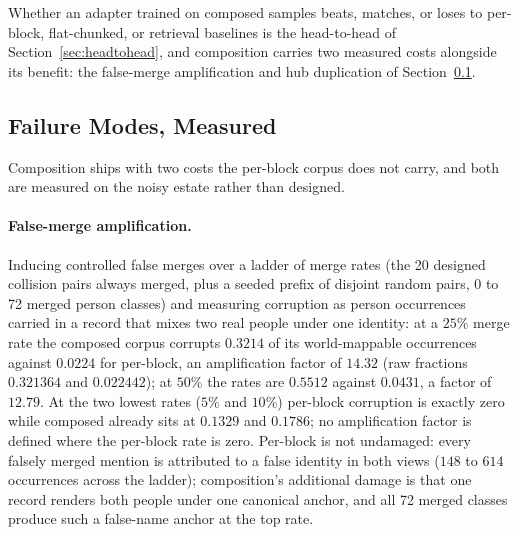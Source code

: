 \documentclass{article}
\begin{document}
Whether an adapter trained on composed samples beats, matches, or loses to per-block, flat-chunked, or retrieval baselines is the head-to-head of Section~\ref{sec:headtohead}, and composition carries two measured costs alongside its benefit: the false-merge amplification and hub duplication of Section~\ref{sec:failuremodes}.

\subsection{Failure Modes, Measured}
\label{sec:failuremodes}

Composition ships with two costs the per-block corpus does not carry, and both are measured on the noisy estate rather than designed.

\paragraph{False-merge amplification.}
Inducing controlled false merges over a ladder of merge rates (the 20 designed collision pairs always merged, plus a seeded prefix of disjoint random pairs, 0 to 72 merged person classes) and measuring corruption as person occurrences carried in a record that mixes two real people under one identity: at a $25\%$ merge rate the composed corpus corrupts $0.3214$ of its world-mappable occurrences against $0.0224$ for per-block, an amplification factor of $14.32$ (raw fractions $0.321364$ and $0.022442$); at $50\%$ the rates are $0.5512$ against $0.0431$, a factor of $12.79$. At the two lowest rates ($5\%$ and $10\%$) per-block corruption is exactly zero while composed already sits at $0.1329$ and $0.1786$; no amplification factor is defined where the per-block rate is zero. Per-block is not undamaged: every falsely merged mention is attributed to a false identity in both views ($148$ to $614$ occurrences across the ladder); composition's additional damage is that one record renders both people under one canonical anchor, and all 72 merged classes produce such a false-name anchor at the top rate.
\end{document}
